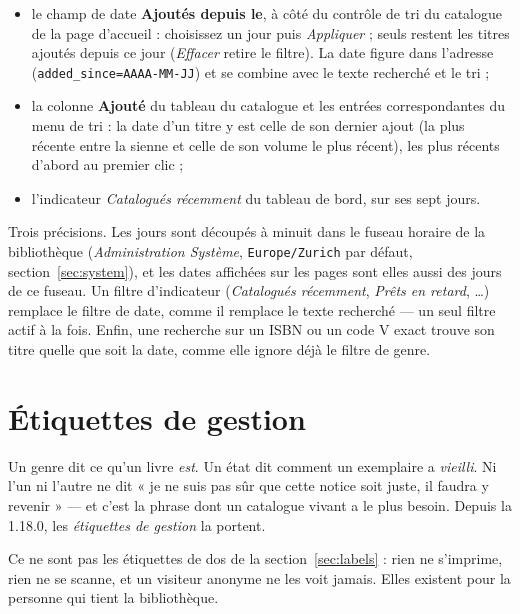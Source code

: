 \begin{itemize}
  \item le champ de date \textbf{Ajoutés depuis le}, à côté du contrôle
        de tri du catalogue de la page d'accueil : choisissez un jour
        puis \emph{Appliquer} ; seuls restent les titres ajoutés depuis
        ce jour (\emph{Effacer} retire le filtre). La date figure dans
        l'adresse (\texttt{added\_since=AAAA-MM-JJ}) et se combine avec
        le texte recherché et le tri ;
  \item la colonne \textbf{Ajouté} du tableau du catalogue et les
        entrées correspondantes du menu de tri : la date d'un titre y
        est celle de son dernier ajout (la plus récente entre la sienne
        et celle de son volume le plus récent), les plus récents
        d'abord au premier clic ;
  \item l'indicateur \emph{Catalogués récemment} du tableau de bord,
        sur ses sept jours.
\end{itemize}

\begin{note}
Trois précisions. Les jours sont découpés à minuit dans le fuseau
horaire de la bibliothèque (\emph{Administration \textrightarrow{}
Système}, \texttt{Europe/Zurich} par défaut, section~\ref{sec:system}),
et les dates affichées sur les pages sont elles aussi des jours de ce
fuseau. Un filtre d'indicateur (\emph{Catalogués
récemment}, \emph{Prêts en retard}, \dots) remplace le filtre de date, comme
il remplace le texte recherché --- un seul filtre actif à la fois.
Enfin, une recherche sur un ISBN ou un code V exact trouve son titre
quelle que soit la date, comme elle ignore déjà le filtre de genre.
\end{note}

\section{Étiquettes de gestion}\label{sec:management-labels}

Un genre dit ce qu'un livre \emph{est}. Un état dit comment un
exemplaire a \emph{vieilli}. Ni l'un ni l'autre ne dit « je ne suis pas
sûr que cette notice soit juste, il faudra y revenir » --- et c'est la
phrase dont un catalogue vivant a le plus besoin. Depuis la 1.18.0, les
\emph{étiquettes de gestion} la portent.

Ce ne sont pas les étiquettes de dos de la section~\ref{sec:labels} :
rien ne s'imprime, rien ne se scanne, et un visiteur anonyme ne les voit
jamais. Elles existent pour la personne qui tient la bibliothèque.

